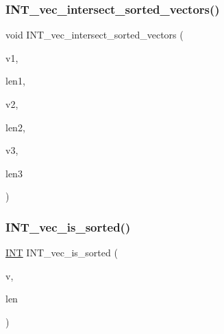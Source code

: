 \mbox{\label{sorting_8_c_a35c06b63646394d7b7ae5022271b9ade}} 
\subsubsection{\texorpdfstring{I\+N\+T\+\_\+vec\+\_\+intersect\+\_\+sorted\+\_\+vectors()}{INT\_vec\_intersect\_sorted\_vectors()}}
{\footnotesize\ttfamily void I\+N\+T\+\_\+vec\+\_\+intersect\+\_\+sorted\+\_\+vectors (\begin{DoxyParamCaption}\item[{\mbox{\hyperlink{galois_8h_a09fddde158a3a20bd2dcadb609de11dc}{I\+NT}} $\ast$}]{v1,  }\item[{\mbox{\hyperlink{galois_8h_a09fddde158a3a20bd2dcadb609de11dc}{I\+NT}}}]{len1,  }\item[{\mbox{\hyperlink{galois_8h_a09fddde158a3a20bd2dcadb609de11dc}{I\+NT}} $\ast$}]{v2,  }\item[{\mbox{\hyperlink{galois_8h_a09fddde158a3a20bd2dcadb609de11dc}{I\+NT}}}]{len2,  }\item[{\mbox{\hyperlink{galois_8h_a09fddde158a3a20bd2dcadb609de11dc}{I\+NT}} $\ast$}]{v3,  }\item[{\mbox{\hyperlink{galois_8h_a09fddde158a3a20bd2dcadb609de11dc}{I\+NT}} \&}]{len3 }\end{DoxyParamCaption})}

\mbox{\label{sorting_8_c_ae67a26c74f69d7630c00f3b222c9be93}} 
\subsubsection{\texorpdfstring{I\+N\+T\+\_\+vec\+\_\+is\+\_\+sorted()}{INT\_vec\_is\_sorted()}}
{\footnotesize\ttfamily \mbox{\hyperlink{galois_8h_a09fddde158a3a20bd2dcadb609de11dc}{I\+NT}} I\+N\+T\+\_\+vec\+\_\+is\+\_\+sorted (\begin{DoxyParamCaption}\item[{\mbox{\hyperlink{galois_8h_a09fddde158a3a20bd2dcadb609de11dc}{I\+NT}} $\ast$}]{v,  }\item[{\mbox{\hyperlink{galois_8h_a09fddde158a3a20bd2dcadb609de11dc}{I\+NT}}}]{len }\end{DoxyParamCaption})}

